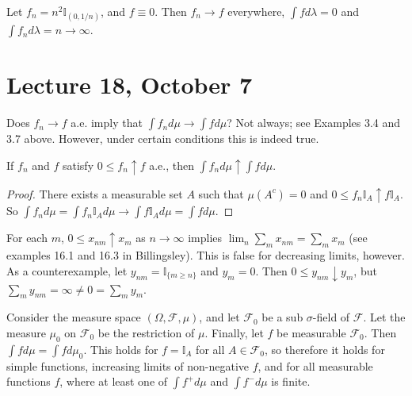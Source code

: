 \documentclass[11pt,fleqn]{book} %
\begin{document}
\begin{example}
	Let $f_n = n^2 \mathbb{I}_{(0,1/n)}$, and $f \equiv 0$. Then $f_n \to f$ everywhere, $\int f d\lambda = 0$ and $\int f_n d\lambda = n \to \infty$.
\end{example}

\section{Lecture 18, October 7}

Does $f_n \to f$ a.e. imply that $\int f_n d\mu \to \int f d\mu$? Not always; see Examples 3.4 and 3.7 above. However, under certain conditions this is indeed true.

\begin{theorem} \label{thm:monotone-convergence}
	If $f_n$ and $f$ satisfy $0 \leq f_n \uparrow f$ a.e., then $\int f_n d\mu \uparrow \int f d\mu$.
\end{theorem}

\begin{proof}
	There exists a measurable set $A$ such that $\mu(A^c) = 0$ and $0 \leq f_n \mathbb{I}_A \uparrow f \mathbb{I}_A$. So $\int f_n d\mu = \int f_n \mathbb{I}_A d\mu \to \int f \mathbb{I}_A d\mu = \int f d\mu$.
\end{proof}

\begin{example}
	For each $m$, $0 \leq x_{nm} \uparrow x_m$ as $n \to \infty$ implies $\lim_n \sum_m x_{nm} = \sum_m x_m$ (see examples 16.1 and 16.3 in Billingsley). This is false for decreasing limits, however. As a counterexample, let $y_{nm} = \mathbb{I}_{\{m \geq n\}}$ and $y_m = 0$. Then $0 \leq y_{nm} \downarrow y_m$, but $\sum_m y_{nm} = \infty \neq 0 = \sum_m y_m$.
\end{example}

\begin{example}
	Consider the measure space $(\Omega,\mathcal{F},\mu)$, and let $\mathcal{F}_0$ be a sub $\sigma$-field of $\mathcal{F}$. Let the measure $\mu_0$ on $\mathcal{F}_0$ be the restriction of $\mu$. Finally, let $f$ be measurable $\mathcal{F}_0$. Then $\int f d\mu = \int f d\mu_{0}$. This holds for $f = \mathbb{I}_A$ for all $A \in \mathcal{F}_0$, so therefore it holds for simple functions, increasing limits of non-negative $f$, and for all measurable functions $f$, where at least one of $\int f^+ d\mu$ and $\int f^- d\mu$ is finite.
\end{example}
\end{document}
